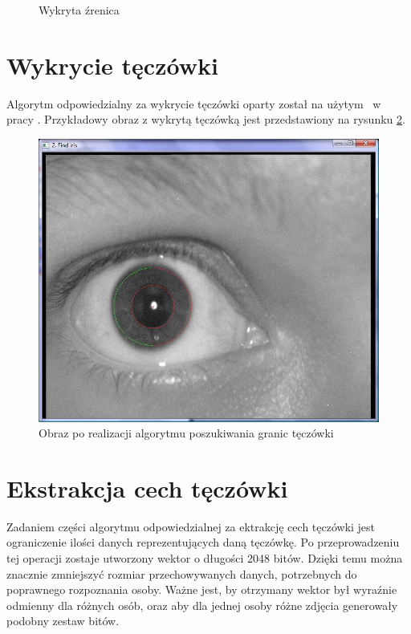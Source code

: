 \begin{itemize}
\begin{figure}
\begin{center}
\caption{Wykryta źrenica}
\label{fig:zrenica2}
\end{center}
\end{figure}
\end{itemize}


\section{Wykrycie tęczówki}
\label{sec:wykrycieTeczowki}
Algorytm odpowiedzialny za wykrycie tęczówki oparty został na użytym ~w pracy \cite{Gl11}. Przykładowy obraz z wykrytą tęczówką jest przedstawiony na rysunku \ref{fig:teczowkaNasza}.
\begin{figure}
\begin{center}
\includegraphics[scale=0.5]{teczowka.jpg}
\caption{Obraz po realizacji algorytmu poszukiwania granic tęczówki}
\label{fig:teczowkaNasza}
\end{center}
\end{figure}

\section{Ekstrakcja cech tęczówki}
\label{sec:ekstrakcja}
Zadaniem części algorytmu odpowiedzialnej za ektrakcję cech tęczówki jest ograniczenie ilości danych reprezentujących daną tęczówkę. Po przeprowadzeniu tej operacji zostaje utworzony wektor o długości 2048 bitów. Dzięki temu można znacznie zmniejszyć rozmiar przechowywanych danych, potrzebnych do poprawnego rozpoznania osoby. Ważne jest, by otrzymany wektor był wyraźnie odmienny dla różnych osób, oraz aby dla jednej osoby różne zdjęcia generowały podobny zestaw bitów. 

